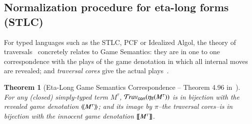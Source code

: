\documentclass{elsarticle}
\theoremstyle{plain}
\newtheorem{theorem}{Theorem}[section]
\theoremstyle{definition}
\theoremstyle{remark}
\newcommand{\concrete}{{\sf con}}
\newcommand{\travsetcon}{{\travset_\concrete}}
\def\coresymbol{\pi} %
\begin{document}
\subsection{Normalization procedure for eta-long forms (STLC)}

For typed languages such as the STLC, PCF or Idealized Algol, the theory of traversals~\cite{OngLics2006} concretely relates to Game Semantics: they are in one to one correspondence with the plays of the game denotation in which all internal moves are revealed; and \emph{traversal cores} give the actual plays~\cite{BlumPhd}.
\begin{theorem}[Eta-Long Game Semantics Correspondence -- Theorem 4.96 in~\cite{BlumPhd}]
\label{thm:gamesem_correspondence_stlc}
For any (closed) simply-typed term $M^\tau$,
 $\travsetcon(\etalf{M^\tau})$ is in bijection with the \emph{revealed game denotation} ${\langle\!\langle M^\tau \rangle\!\rangle}$; and its image by $\coresymbol$--the traversal cores--is in bijection with the innocent game denotation ${[\![ M^\tau ]\!]}$.
\end{theorem}


\end{document}
